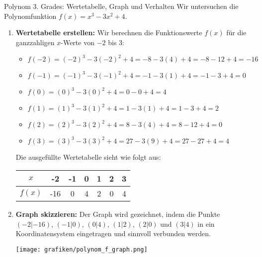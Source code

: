\begin{loesungsumgebung}{Polynom 3. Grades: Wertetabelle, Graph und Verhalten}
Wir untersuchen die Polynomfunktion $f(x) = x^3 - 3x^2 + 4$.

\begin{enumerate}[label=(\alph*)]
    \item \textbf{Wertetabelle erstellen:}
    Wir berechnen die Funktionswerte $f(x)$ für die ganzzahligen $x$-Werte von $-2$ bis $3$:
    \begin{itemize}
        \item $f(-2) = (-2)^3 - 3(-2)^2 + 4 = -8 - 3(4) + 4 = -8 - 12 + 4 = -16$
        \item $f(-1) = (-1)^3 - 3(-1)^2 + 4 = -1 - 3(1) + 4 = -1 - 3 + 4 = 0$
        \item $f(0) = (0)^3 - 3(0)^2 + 4 = 0 - 0 + 4 = 4$
        \item $f(1) = (1)^3 - 3(1)^2 + 4 = 1 - 3(1) + 4 = 1 - 3 + 4 = 2$
        \item $f(2) = (2)^3 - 3(2)^2 + 4 = 8 - 3(4) + 4 = 8 - 12 + 4 = 0$
        \item $f(3) = (3)^3 - 3(3)^2 + 4 = 27 - 3(9) + 4 = 27 - 27 + 4 = 4$
    \end{itemize}
    Die ausgefüllte Wertetabelle sieht wie folgt aus:
    \begin{center}
    \begin{tabular}{c||c|c|c|c|c|c}
    $x$ & -2 & -1 & 0 & 1 & 2 & 3 \\
    \hline
    $f(x)$ & -16 & 0 & 4 & 2 & 0 & 4 \\
    \end{tabular}
    \end{center}

    \item \textbf{Graph skizzieren:}
    Der Graph wird gezeichnet, indem die Punkte $(-2|-16)$, $(-1|0)$, $(0|4)$, $(1|2)$, $(2|0)$ und $(3|4)$ in ein Koordinatensystem eingetragen und sinnvoll verbunden werden.
    \begin{center}
    \texttt{[image: grafiken/polynom\_f\_graph.png]}
    \label{fig:polynom_f_graph}
    \end{center}


\end{enumerate}
\end{loesungsumgebung}
